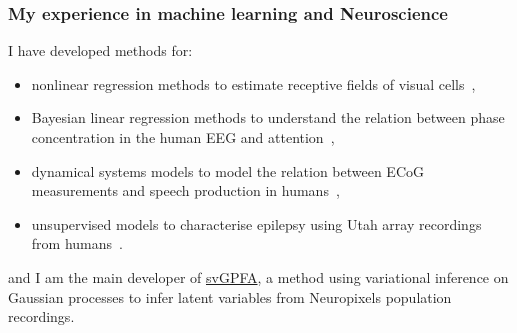 
\begin{frame}
    \frametitle{My experience in machine learning and Neuroscience}

    I have developed methods for:

    \begin{itemize}

        \item nonlinear regression methods to estimate receptive fields of
            visual cells~\citep{rapelaEtAl06,rapelaEtAl10},

        \item Bayesian linear regression methods to understand the relation
            between phase concentration in the human EEG and
            attention~\citep{rapelaEtAl12-attentionSwitch,rapelaEtAl12-eyeTracking,rapelaEtAl18-avshift},

        \item dynamical systems models to model the relation between ECoG
            measurements and speech production in
            humans~\citep{rapelaInPrepTWsInSpeech,rapelaInPrepSyncTWs,rapelaInPrepSyncTWsII},

        \item unsupervised models to characterise epilepsy using Utah array
            recordings from
            humans~\citep{rapelaEtAl19-epilepsy-tsne,rapelaAndTodorov19-epilepsy-hmm}.

    \end{itemize}

    and I am the main developer of
    \href{https://github.com/joacorapela/svGPFA}{svGPFA}, a method using
    variational inference on Gaussian processes to infer latent variables from
    Neuropixels population recordings.

\end{frame}


